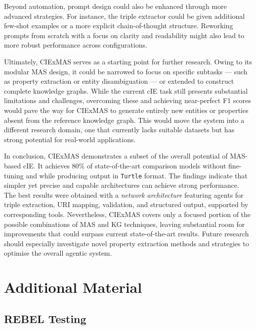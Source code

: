 \documentclass[a4paper,oneside,bibliography=totoc]{scrbook}
\begin{document}
Beyond automation, prompt design could also be enhanced through more advanced strategies. For instance, the triple extractor could be given additional few-shot examples or a more explicit chain-of-thought structure. Reworking prompts from scratch with a focus on clarity and readability might also lead to more robust performance across configurations.

Ultimately, CIExMAS serves as a starting point for further research. Owing to its modular \ac{MAS} design, it could be narrowed to focus on specific subtasks — such as property extraction or entity disambiguation — or extended to construct complete knowledge graphs. While the current \ac{cIE} task still presents substantial limitations and challenges, overcoming these and achieving near-perfect F1 scores would pave the way for CIExMAS to generate entirely new entities or properties absent from the reference knowledge graph. This would move the system into a different research domain, one that currently lacks suitable datasets but has strong potential for real-world applications.

In conclusion, CIExMAS demonstrates a subset of the overall potential of \ac{MAS}-based \ac{cIE}. It achieves 80\% of state-of-the-art comparison models without fine-tuning and while producing output in \texttt{Turtle} format. The findings indicate that simpler yet precise and capable architectures can achieve strong performance. The best results were obtained with a \textit{network architecture} featuring agents for triple extraction, \ac{URI} mapping, validation, and structured output, supported by corresponding tools. Nevertheless, CIExMAS covers only a focused portion of the possible combinations of \ac{MAS} and \ac{KG} techniques, leaving substantial room for improvements that could surpass current state-of-the-art results. Future research should especially investigate novel property extraction methods and strategies to optimise the overall agentic system.



\appendix
\chapter{Additional Material}
\label{ch:additional_material}

\section{REBEL Testing}
\label{sec:rebel_testing}
\end{document}
